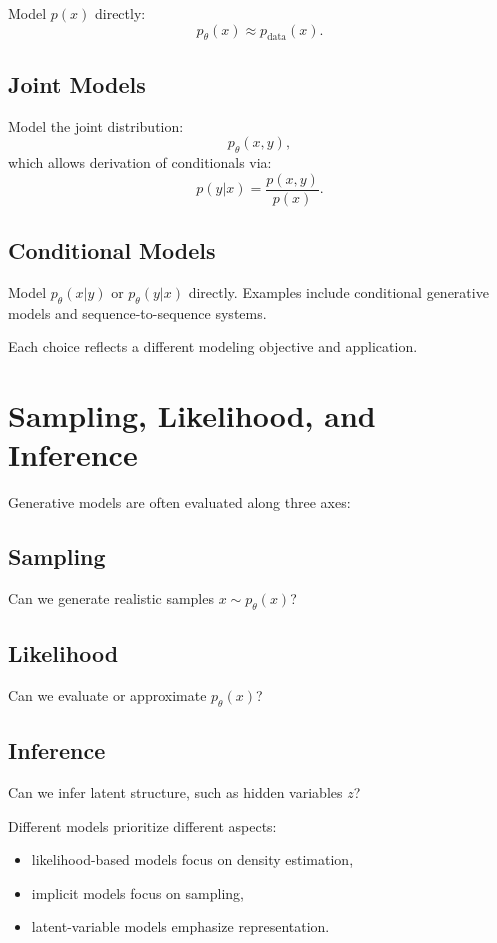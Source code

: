 Model $p(x)$ directly:
\[
p_\theta(x) \approx p_{\text{data}}(x).
\]

\subsection{Joint Models}

Model the joint distribution:
\[
p_\theta(x,y),
\]
which allows derivation of conditionals via:
\[
p(y|x) = \frac{p(x,y)}{p(x)}.
\]

\subsection{Conditional Models}

Model $p_\theta(x|y)$ or $p_\theta(y|x)$ directly. Examples include conditional generative models and sequence-to-sequence systems.

Each choice reflects a different modeling objective and application.

\section{Sampling, Likelihood, and Inference}

Generative models are often evaluated along three axes:

\subsection{Sampling}

Can we generate realistic samples $x \sim p_\theta(x)$?

\subsection{Likelihood}

Can we evaluate or approximate $p_\theta(x)$?

\subsection{Inference}

Can we infer latent structure, such as hidden variables $z$?

Different models prioritize different aspects:
\begin{itemize}
    \item likelihood-based models focus on density estimation,
    \item implicit models focus on sampling,
    \item latent-variable models emphasize representation.
\end{itemize}

